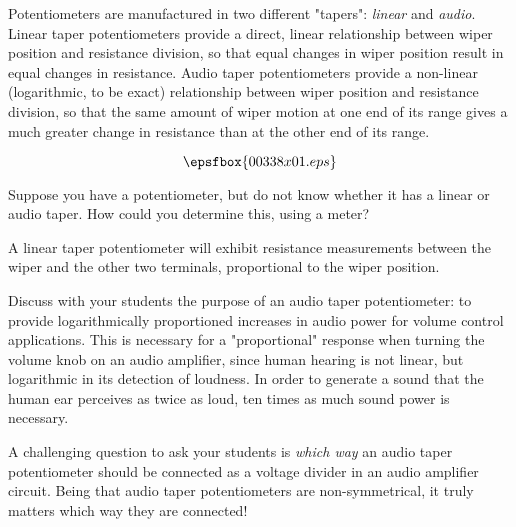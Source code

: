 

Potentiometers are manufactured in two different "tapers": {\it linear} and {\it audio}.  Linear taper potentiometers provide a direct, linear relationship between wiper position and resistance division, so that equal changes in wiper position result in equal changes in resistance.  Audio taper potentiometers provide a non-linear (logarithmic, to be exact) relationship between wiper position and resistance division, so that the same amount of wiper motion at one end of its range gives a much greater change in resistance than at the other end of its range.

$$\epsfbox{00338x01.eps}$$

Suppose you have a potentiometer, but do not know whether it has a linear or audio taper.  How could you determine this, using a meter? 







A linear taper potentiometer will exhibit resistance measurements between the wiper and the other two terminals, proportional to the wiper position.







Discuss with your students the purpose of an audio taper potentiometer: to provide logarithmically proportioned increases in audio power for volume control applications.  This is necessary for a "proportional" response when turning the volume knob on an audio amplifier, since human hearing is not linear, but logarithmic in its detection of loudness.  In order to generate a sound that the human ear perceives as twice as loud, ten times as much sound power is necessary.

A challenging question to ask your students is {\it which way} an audio taper potentiometer should be connected as a voltage divider in an audio amplifier circuit.  Being that audio taper potentiometers are non-symmetrical, it truly matters which way they are connected!




